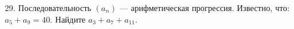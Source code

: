 29. Последовательность $(a_n)$ --- арифметическая прогрессия. Известно, что: $a_5+a_9=40.$ Найдите $a_3+a_7+a_{11}.$\\
